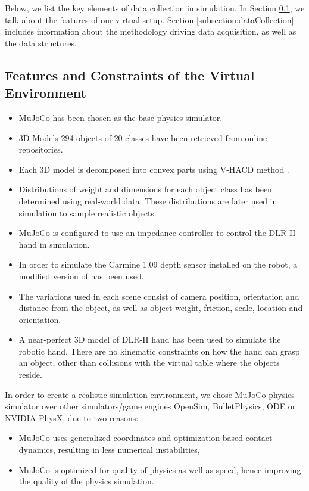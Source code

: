 
Below, we list the key elements of data collection in simulation. In Section \ref{subsection:environment}, we talk about the features of our virtual setup. Section \ref{subsection:dataCollection} includes information about the methodology driving data acquisition, as well as the data structures. 

\subsection{Features and Constraints of the Virtual Environment}
\label{subsection:environment}

\begin{itemize}
\item MuJoCo \cite{MuJoCo} has been chosen as the base physics simulator. 
\item 3D Models 294 objects of 20 classes have been retrieved from online repositories.
\item Each 3D model is decomposed into convex parts using V-HACD method \cite{V-HACD}.
\item Distributions of weight and dimensions for each object class has been determined using real-world data. These distributions are later used in simulation to sample realistic objects.
\item MuJoCo is configured to use an impedance controller to control the DLR-II hand in simulation.
\item In order to simulate the Carmine 1.09 depth sensor installed on the robot, a modified version of \cite{KinectSimulator} has been used. 
\item The variations used in each scene consist of camera position, orientation and distance from the object, as well as object weight, friction, scale, location and orientation. 
\item A near-perfect 3D model of DLR-II hand has been used to simulate the robotic hand. There are no kinematic constraints on how the hand can grasp an object, other than collisions with the virtual table where the objects reside. 
\end{itemize}

In order to create a realistic simulation environment, we chose MuJoCo \cite{MuJoCo} physics simulator over other simulators/game engines OpenSim, BulletPhysics, ODE or NVIDIA PhysX, due to two reasons: 
\begin{itemize}
\item MuJoCo uses generalized coordinates and optimization-based contact dynamics, resulting in less numerical instabilities,
\item MuJoCo is optimized for quality of physics as well as speed, hence improving the quality of the physics simulation.
\end{itemize}


